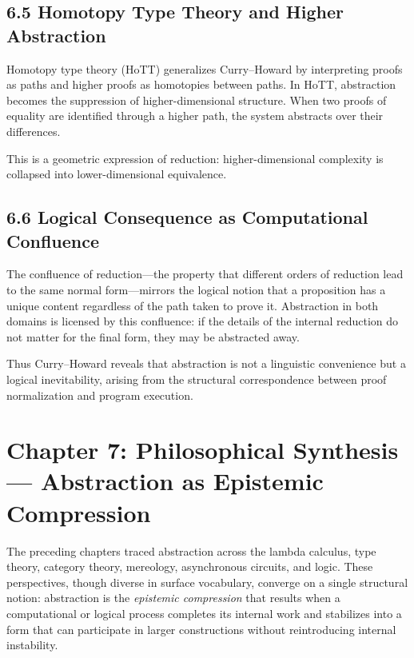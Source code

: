 \documentclass[12pt,letterpaper]{article}
\begin{document}
\subsection{6.5 Homotopy Type Theory and Higher Abstraction}

Homotopy type theory (HoTT) generalizes Curry--Howard by interpreting proofs as paths and higher proofs as homotopies between paths. In HoTT, abstraction becomes the suppression of higher-dimensional structure. When two proofs of equality are identified through a higher path, the system abstracts over their differences.

This is a geometric expression of reduction: higher-dimensional complexity is collapsed into lower-dimensional equivalence.

\subsection{6.6 Logical Consequence as Computational Confluence}

The confluence of reduction—the property that different orders of reduction lead to the same normal form—mirrors the logical notion that a proposition has a unique content regardless of the path taken to prove it. Abstraction in both domains is licensed by this confluence: if the details of the internal reduction do not matter for the final form, they may be abstracted away.

Thus Curry--Howard reveals that abstraction is not a linguistic convenience but a logical inevitability, arising from the structural correspondence between proof normalization and program execution.

\newpage

\section{Chapter 7: Philosophical Synthesis — Abstraction as Epistemic Compression}

The preceding chapters traced abstraction across the lambda calculus, type theory, category theory, mereology, asynchronous circuits, and logic. These perspectives, though diverse in surface vocabulary, converge on a single structural notion: abstraction is the \emph{epistemic compression} that results when a computational or logical process completes its internal work and stabilizes into a form that can participate in larger constructions without reintroducing internal instability.
\end{document}
